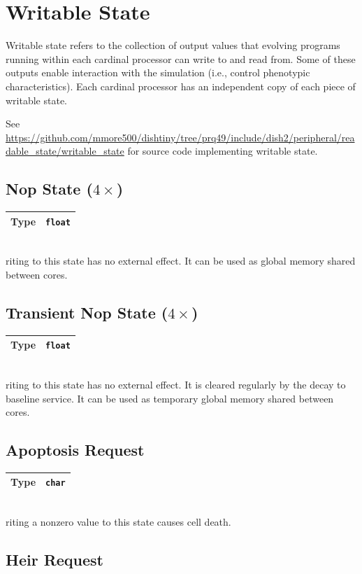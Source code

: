 \newcommand{\writablestatedef}[2]{
    \begin{tabular}{|
        >{\columncolor[HTML]{C0C0C0}}l |l|}
        \hline
        Type & \texttt{#1} \\ \hline
    \end{tabular} \\
}

\section{Writable State}

Writable state refers to the collection of output values that evolving programs running within each cardinal processor can write to and read from.
Some of these outputs enable interaction with the simulation (i.e., control phenotypic characteristics).
Each cardinal processor has an independent copy of each piece of writable state.

See \url{https://github.com/mmore500/dishtiny/tree/prq49/include/dish2/peripheral/readable_state/writable_state} for source code implementing writable state.

\subsection{Nop State ($4\times$)}

\writablestatedef{float}

Writing to this state has no external effect.
It can be used as global memory shared between cores.

\subsection{Transient Nop State ($4\times$)}

\writablestatedef{float}

Writing to this state has no external effect.
It is cleared regularly by the decay to baseline service.
It can be used as temporary global memory shared between cores.

\subsection{Apoptosis Request}

\writablestatedef{char}

Writing a nonzero value to this state causes cell death.

\subsection{Heir Request}

